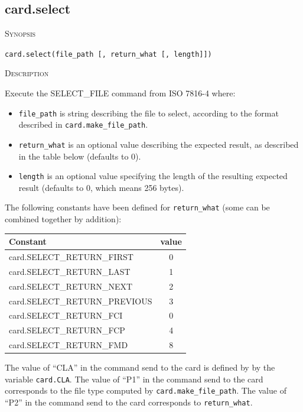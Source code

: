 \documentclass[11pt]{report}
\newcommand{\mansection}[1]{\vspace{0.5em}\par\noindent\textsc{#1}\vspace{0.5em}\par}
\newcommand{\syn}[1]{\texttt{#1}}
\begin{document}
\subsection{card.select}

\mansection{Synopsis}
\syn{card.select(file\_path [, return\_what [, length]])}

\mansection{Description}
  Execute the SELECT\_FILE command from ISO 7816-4 where:
  \begin{itemize}
  \item{\syn{file\_path} is string describing the file to select, according to the format described in \syn{card.make\_file\_path}.}
  \item{\syn{return\_what} is an optional value describing the expected result, as described in the table below (defaults to 0).}
  \item{\syn{length} is an optional value specifying the length of the resulting expected result (defaults to 0, which means 256 bytes).}
  \end{itemize}

  The following constants have been defined for \syn{return\_what} (some can be combined together by addition):

  \vspace{2em}
  \begin{tabular}{|l|c|}
  \hline
  Constant & value \\
  \hline
  card.SELECT\_RETURN\_FIRST      & 0 \\
  card.SELECT\_RETURN\_LAST       & 1 \\
  card.SELECT\_RETURN\_NEXT       & 2 \\
  card.SELECT\_RETURN\_PREVIOUS   & 3 \\
  card.SELECT\_RETURN\_FCI        & 0 \\
  card.SELECT\_RETURN\_FCP        & 4 \\
  card.SELECT\_RETURN\_FMD        & 8 \\
  \hline
  \end{tabular}
  \vspace{2em}

  The value of ``CLA'' in the command send to the card is defined by by the variable \syn{card.CLA}.
  The value of ``P1'' in the command send to the card corresponds to the file type computed by \syn{card.make\_file\_path}.
  The value of ``P2'' in the command send to the card corresponds to \syn{return\_what}.
\end{document}
